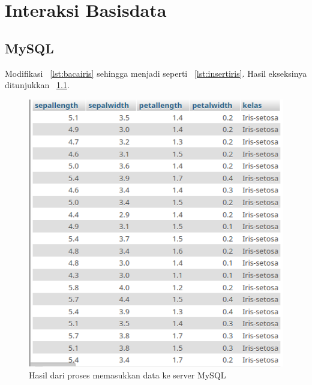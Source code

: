 \chapter{Interaksi Basisdata}
\section{MySQL}
Modifikasi \lstlistingname~\ref{lst:bacairis} sehingga menjadi seperti \lstlistingname~\ref{lst:insertiris}. Hasil ekseksinya ditunjukkan \figurename~\ref{fig:insertmysql}.
 
 

\begin{figure}
  \begin{center}
    \includegraphics[scale=2.0]{pics/insertmysql.png}
    \caption{Hasil dari proses memasukkan data ke server MySQL}
    \label{fig:insertmysql}
  \end{center}
\end{figure}
